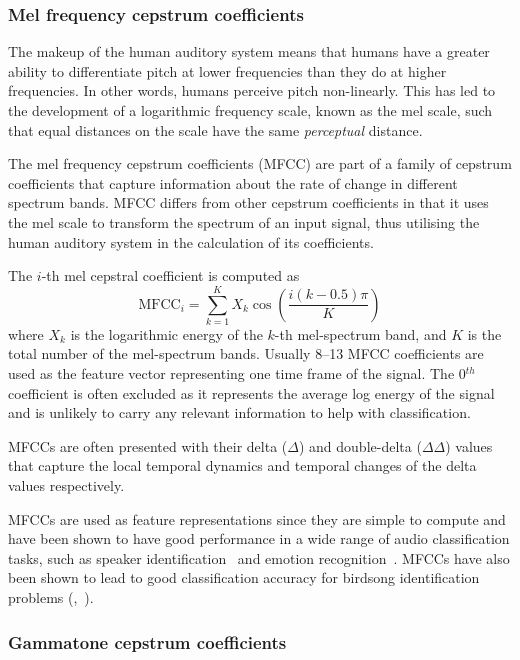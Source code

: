 \subsubsection{Mel frequency cepstrum coefficients}

The makeup of the human auditory system means that humans have a greater ability
to differentiate pitch at lower frequencies than they do at higher frequencies.
In other words, humans perceive pitch non-linearly. This has led to the
development of a logarithmic frequency scale, known as the mel scale, such that
equal distances on the scale have the same \textit{perceptual} distance.

The mel frequency cepstrum coefficients (MFCC) are part of a family of cepstrum
coefficients that capture information about the rate of change in different
spectrum bands. MFCC differs from other cepstrum coefficients in that it uses the
mel scale to transform the spectrum of an input signal, thus utilising the human
auditory system in the calculation of its coefficients.

The $i$-th mel cepstral coefficient is computed as~\cite{davis1980comparison}
\begin{equation}
\text{MFCC}_i = \sum_{k=1}^{K} X_k \cos \left(
  \frac{i(k-0.5)\pi}{K}
\right)
\end{equation}
where $X_k$ is the logarithmic energy of the $k$-th mel-spectrum band, and $K$
is the total number of the mel-spectrum bands. Usually 8--13 MFCC coefficients
are used as the feature vector representing one time frame of the signal. The
0$^{th}$ coefficient is often excluded as it represents the average log energy
of the signal and is unlikely to carry any relevant information to help with
classification.

MFCCs are often presented with their delta ($\Delta$) and double-delta
($\Delta\Delta$) values that capture the local temporal dynamics and temporal
changes of the delta values respectively.

MFCCs are used as feature representations since they are simple to compute and
have been shown to have good performance in a wide range of audio classification
tasks, such as speaker identification~\cite{muda2010voice} and emotion
recognition~\cite{likitha2017speech}. MFCCs have also been shown to lead to good
classification accuracy for birdsong identification problems
(\cite{fagerlund2007bird},~\cite{ramashini2022robust}).

\subsubsection{Gammatone cepstrum coefficients}

